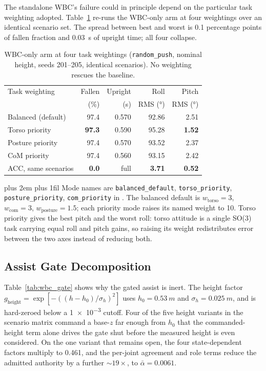 \documentclass[conference]{IEEEtran}
\newcommand{\tabnote}{\par\leftskip=0pt\rightskip=0pt plus 2em%
  \parfillskip=0pt plus 1fil\relax}
\begin{document}
The standalone WBC's failure could in principle depend on the particular task
weighting adopted. Table~\ref{tab:wbc_taskweight} re-runs
the WBC-only arm at four weightings over an identical scenario set. The spread
between best and worst is \num{0.1} percentage points of fallen fraction and
\SI{0.03}{s} of upright time; all four collapse.

\begin{table}[h]
\centering
\caption{WBC-only arm at four task weightings (\texttt{random\_push}, nominal height, seeds 201--205, identical scenarios). No weighting rescues the baseline.}
\label{tab:wbc_taskweight}
\footnotesize
\setlength{\tabcolsep}{4pt}
\begin{tabular}{@{}>{\raggedright\arraybackslash}p{}rrrr@{}}
\toprule
Task weighting & Fallen & Upright & Roll & Pitch \\
               & (\si{\percent}) & (s) & RMS (\si{\degree}) & RMS (\si{\degree}) \\
\midrule
Balanced (default) & 97.4 & 0.570 & 92.86 & 2.51 \\
Torso priority     & \textbf{97.3} & 0.590 & 95.28 & \textbf{1.52} \\
Posture priority   & 97.4 & 0.570 & 93.52 & 2.37 \\
CoM priority       & 97.4 & 0.560 & 93.15 & 2.42 \\
\midrule
ACC, same scenarios & \textbf{0.0} & full & \textbf{3.71} & \textbf{0.52} \\
\bottomrule
\end{tabular}
\vspace{4pt}\tabnote\noindent\footnotesize
Mode names are \texttt{balanced\_default}, \texttt{torso\_priority}, \texttt{posture\_priority}, \texttt{com\_priority} in .
The balanced default is $w_{\text{torso}}{=}3$, $w_{\text{com}}{=}3$, $w_{\text{posture}}{=}1.5$; each priority mode raises its named weight to \num{10}.
Torso priority gives the best pitch and the worst roll: torso attitude is a single SO(3) task carrying equal roll and pitch gains, so raising its weight redistributes error between the two axes instead of reducing both.
\end{table}

\subsection{Assist Gate Decomposition}

Table~\ref{tab:wbc_gate} shows why the gated assist is inert.
The height factor $g_{\text{height}} = \exp[-((h-h_0)/\sigma_h)^2]$ uses
$h_0{=}\SI{0.53}{m}$ and $\sigma_h{=}\SI{0.025}{m}$, and is hard-zeroed below a
\num{1e-3} cutoff. Four of the five height variants in the scenario matrix
command a base-$z$ far enough from $h_0$ that the commanded-height term alone
drives the gate shut before the measured height is even considered.
On the one variant that remains open, the four state-dependent factors multiply
to \num{0.461}, and the per-joint agreement and role terms reduce the admitted
authority by a further ${\sim}\num{19}\times$, to $\bar\alpha{=}\num{0.0061}$.
\end{document}
